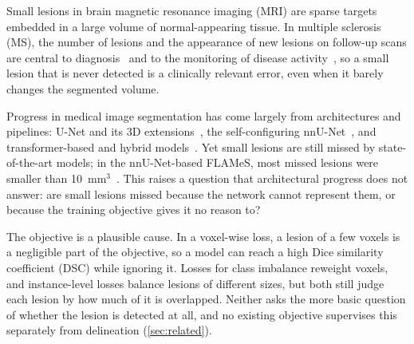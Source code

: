 Small lesions in brain magnetic resonance imaging (MRI) are sparse targets
embedded in a large volume of normal-appearing tissue. In multiple
sclerosis (MS), the number of lesions and the appearance of new lesions on
follow-up scans are central to diagnosis~\cite{barkhof_2024_2025} and to
the monitoring of disease activity~\cite{wattjes_2021_2021}, so a small
lesion that is never detected is a clinically relevant error, even when it
barely changes the segmented volume.

Progress in medical image segmentation has come largely from architectures
and pipelines: U-Net and its 3D extensions~\cite{navab_u-net_2015}, the
self-configuring nnU-Net~\cite{isensee_nnu-net_2021}, and transformer-based
and hybrid models~\cite{hatamizadeh_unetr_2021,hatamizadeh_swin_2022}. Yet
small lesions are still missed by state-of-the-art models; in the
nnU-Net-based FLAMeS, most missed lesions were smaller than
10~mm$^3$~\cite{dereskewicz_flames_2025}. This raises a question that
architectural progress does not answer: are small lesions missed because
the network cannot represent them, or because the training objective gives
it no reason to?

The objective is a plausible cause. In a voxel-wise loss, a lesion of a
few voxels is a negligible part of the objective, so a model can reach a
high Dice similarity coefficient (DSC) while ignoring it. Losses for class
imbalance reweight voxels, and instance-level losses balance lesions of
different sizes, but both still judge each lesion by how much of it is
overlapped. Neither asks the more basic question of whether the lesion is
detected at all, and no existing objective supervises this separately from
delineation (\cref{sec:related}).

